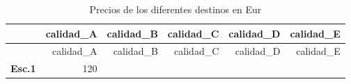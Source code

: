 \documentclass[]{article}
\begin{document}
\begin{longtable}[]{@{}lrrrrr@{}}
\caption{Precios de los diferentes destinos en Eur}\tabularnewline
\toprule
\begin{minipage}[b]{0.14\columnwidth}\raggedright\strut
~\strut
\end{minipage} & \begin{minipage}[b]{0.14\columnwidth}\raggedleft\strut
calidad\_A\strut
\end{minipage} & \begin{minipage}[b]{0.14\columnwidth}\raggedleft\strut
calidad\_B\strut
\end{minipage} & \begin{minipage}[b]{0.14\columnwidth}\raggedleft\strut
calidad\_C\strut
\end{minipage} & \begin{minipage}[b]{0.14\columnwidth}\raggedleft\strut
calidad\_D\strut
\end{minipage} & \begin{minipage}[b]{0.14\columnwidth}\raggedleft\strut
calidad\_E\strut
\end{minipage}\tabularnewline
\midrule
\endfirsthead
\toprule
\begin{minipage}[b]{0.14\columnwidth}\raggedright\strut
~\strut
\end{minipage} & \begin{minipage}[b]{0.14\columnwidth}\raggedleft\strut
calidad\_A\strut
\end{minipage} & \begin{minipage}[b]{0.14\columnwidth}\raggedleft\strut
calidad\_B\strut
\end{minipage} & \begin{minipage}[b]{0.14\columnwidth}\raggedleft\strut
calidad\_C\strut
\end{minipage} & \begin{minipage}[b]{0.14\columnwidth}\raggedleft\strut
calidad\_D\strut
\end{minipage} & \begin{minipage}[b]{0.14\columnwidth}\raggedleft\strut
calidad\_E\strut
\end{minipage}\tabularnewline
\midrule
\endhead
\begin{minipage}[t]{0.14\columnwidth}\raggedright\strut
\textbf{Esc.1}\strut
\end{minipage} & \begin{minipage}[t]{0.14\columnwidth}\raggedleft\strut
120\strut
\end{minipage} & \begin{minipage}[t]{0.14\columnwidth}\raggedleft\strut

\end{minipage}
\end{longtable}
\end{document}
